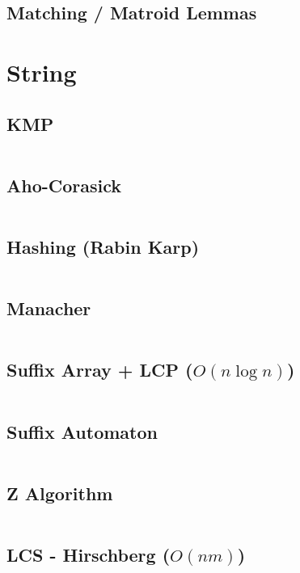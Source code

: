 \documentclass[8pt, a4paper, oneside]{extarticle}
\begin{document}
\begin{multicols*}{2}
\subsection{Matching / Matroid Lemmas}


\section{String}
\subsection{KMP}
\inputminted{c++}{codes/string/kmp.cpp}

\subsection{Aho-Corasick}
\inputminted{c++}{codes/string/aho_corasick.cpp}

\subsection{Hashing (Rabin Karp)}
\inputminted{c++}{codes/string/hashing.cpp}

\subsection{Manacher}
\inputminted{c++}{codes/string/manacher.cpp}

\subsection{Suffix Array + LCP ($O(n \log n)$)}
\inputminted{c++}{codes/string/suffix_array(nlogn).cpp}

\subsection{Suffix Automaton}
\inputminted{c++}{codes/string/suffix_automaton.cpp}

\subsection{Z Algorithm}
\inputminted{c++}{codes/string/z.cpp}

\subsection{LCS - Hirschberg ($O(nm)$)}
\inputminted{c++}{codes/string/hirschberg.cpp}

\end{multicols*}
\end{document}
